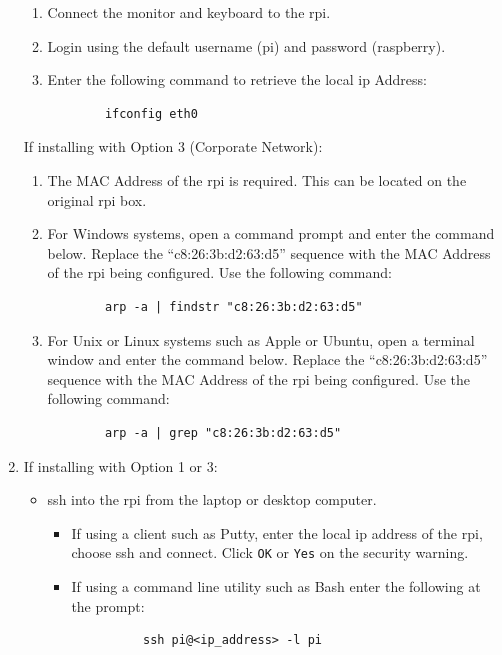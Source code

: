 \documentclass[12pt]{article}
\begin{document}
\begin{enumerate}
\begin{enumerate}
      \item Connect the monitor and keyboard to the \gls{rpi}.
      \item Login using the default username (pi) and password (raspberry).
      \item Enter the following command to retrieve the local \gls{ip} Address:\\
      \begin{verbatim}
        ifconfig eth0
      \end{verbatim}
    \end{enumerate}
  If installing with Option 3 (Corporate Network):
    \begin{enumerate}
      \item The MAC Address of the \gls{rpi} is required. This can be
      located on the original \gls{rpi} box.
      \item For Windows systems, open a command prompt and enter the command
      below. Replace the ``c8:26:3b:d2:63:d5'' sequence with the MAC Address
      of the \gls{rpi} being configured.  Use the following command:
      \begin{verbatim}
        arp -a | findstr "c8:26:3b:d2:63:d5"
      \end{verbatim}
      \item For Unix or Linux systems such as Apple or Ubuntu, open a terminal
      window and enter the command below. Replace the ``c8:26:3b:d2:63:d5''
      sequence with the MAC Address of the \gls{rpi} being configured.
      Use the following command:
      \begin{verbatim}
        arp -a | grep "c8:26:3b:d2:63:d5"
      \end{verbatim}
    \end{enumerate}
  \item If installing with Option 1 or 3:
    \begin{itemize}
      \item \gls{ssh} into the \gls{rpi} from the laptop or desktop computer.
      \begin{itemize}
        \item If using a client such as Putty, enter the local \gls{ip} address
        of the \gls{rpi}, choose \gls{ssh} and connect. Click \verb|OK| or
        \verb|Yes| on the security warning.
        \item If using a command line utility such as Bash enter the
        following at the prompt:
        \begin{verbatim}
          ssh pi@<ip_address> -l pi

\end{verbatim}
\end{itemize}
\end{itemize}
\end{enumerate}
\end{document}
